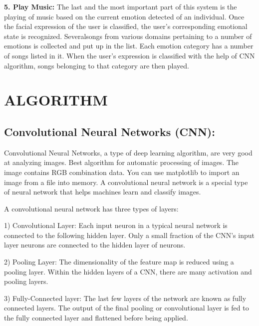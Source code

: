 \documentclass[12pt]{report}
\begin{document}
\textbf{5. Play Music:} The last and the most important part of this system is the playing of music
based on the current emotion detected of an individual. Once the facial expression of the 
user is classified, the user’s corresponding emotional state is recognized. Severalsongs
from various domains pertaining to a number of emotions is collected and put up in the 
list. Each emotion category has a number of songs listed in it. When the user’s
expression is classified with the help of CNN algorithm, songs belonging to that 
category are then played.


\clearpage
\centering
\section{ALGORITHM}

\justifying
\setlength{\parindent}{4em}
\setlength{\parskip}{0.5em}
\renewcommand{\baselinestretch}{1.5}
\normalsize
\subsection{ Convolutional Neural Networks (CNN):}
\hspace{1.7cm} Convolutional Neural Networks, a type of deep learning algorithm, are very good at analyzing 
images. Best algorithm for automatic processing of images. The image contains RGB 
combination data. You can use matplotlib to import an image from a file into memory. A 
convolutional neural network is a special type of neural network that helps machines learn and 
classify images. 

A convolutional neural network has three types of layers:

1) Convolutional Layer: Each input neuron in a typical neural network is connected to the 
following hidden layer. Only a small fraction of the CNN’s input layer neurons are connected 
to the hidden layer of neurons.

2) Pooling Layer: The dimensionality of the feature map is reduced using a pooling layer. 
Within the hidden layers of a CNN, there are many activation and pooling layers.

3) Fully-Connected layer: The last few layers of the network are known as fully connected 
layers. The output of the final pooling or convolutional layer is fed to the fully connected 
layer and flattened before being applied.

\end{document}
